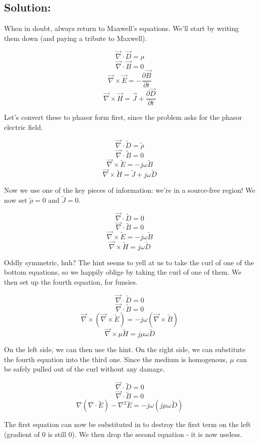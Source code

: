 \documentclass{article}
\begin{document}
\subsection{Solution:}

When in doubt, always return to Maxwell's equations. We'll start by writing them down (and paying a tribute to Maxwell).

$$\vec{\nabla} \cdot \vec{D} = \rho$$
$$\vec{\nabla} \cdot \vec{B} = 0$$
$$\vec{\nabla} \times \vec{E} = -\frac{\partial{\vec{B}}}{\partial t}$$
$$\vec{\nabla} \times \vec{H} = \vec{J} + \frac{\partial{\vec{D}}}{\partial t}$$

Let's convert these to phasor form first, since the problem asks for the phasor electric field.

$$\vec{\nabla} \cdot \tilde{D} = \tilde{\rho}$$
$$\vec{\nabla} \cdot \tilde{B} = 0$$
$$\vec{\nabla} \times \tilde{E} = -j \omega \tilde{B}$$
$$\vec{\nabla} \times \tilde{H} = \tilde{J} + j \omega\tilde{D}$$

Now we use one of the key pieces of information: we're in a source-free region! We now set $\tilde{\rho} = 0$ and $\tilde{J} = 0$.

$$\vec{\nabla} \cdot \tilde{D} = 0$$
$$\vec{\nabla} \cdot \tilde{B} = 0$$
$$\vec{\nabla} \times \tilde{E} = -j \omega \tilde{B}$$
$$\vec{\nabla} \times \tilde{H} = j \omega\tilde{D}$$

Oddly symmetric, huh? The hint seems to yell at us to take the curl of one of the bottom equations, so we happily oblige by taking the curl of one of them. We then set up the fourth equation, for funsies.

$$\vec{\nabla} \cdot \tilde{D} = 0$$
$$\vec{\nabla} \cdot \tilde{B} = 0$$
$$\vec{\nabla} \times (\vec{\nabla} \times \tilde{E}) = - j \omega (\vec{\nabla} \times \tilde{B})$$
$$\vec{\nabla} \times \mu \tilde{H} = j \mu \omega\tilde{D}$$

On the left side, we can then use the hint. On the right side, we can substitute the fourth equation into the third one. Since the medium is homogenous, $\mu$ can be safely pulled out of the curl without any damage.

$$\vec{\nabla} \cdot \tilde{D} = 0$$
$$\vec{\nabla} \cdot \tilde{B} = 0$$
$$\nabla(\nabla \cdot \tilde{E}) - \nabla^2 \tilde{E} = - j \omega (j \mu \omega\tilde{D})$$

The first equation can now be substituted in to destroy the first term on the left (gradient of $0$ is still $0$). We then drop the second equation - it is now useless.
\end{document}
